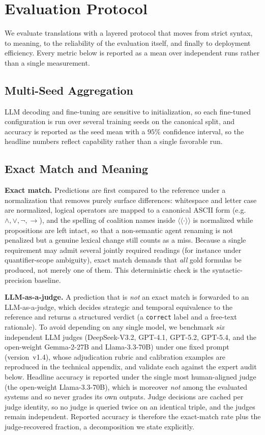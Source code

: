 \section{Evaluation Protocol}
\label{sec:evaluation}
We evaluate translations with a layered protocol that moves from strict syntax, to meaning, to the reliability of the evaluation itself, and finally to deployment efficiency. Every metric below is reported as a mean over independent runs rather than a single measurement.

\subsection{Multi-Seed Aggregation}
LLM decoding and fine-tuning are sensitive to initialization, so each fine-tuned configuration is run over several training seeds on the canonical split, and accuracy is reported as the seed mean with a $95\%$ confidence interval, so the headline numbers reflect capability rather than a single favorable run.

\subsection{Exact Match and Meaning}
\noindent\textbf{Exact match.} Predictions are first compared to the reference under a normalization that removes purely surface differences: whitespace and letter case are normalized, logical operators are mapped to a canonical ASCII form (e.g.\ $\land,\lor,\neg,\to$), and the spelling of coalition names inside $\langle\!\langle\cdot\rangle\!\rangle$ is normalized while propositions are left intact, so that a non-semantic agent renaming is not penalized but a genuine lexical change still counts as a miss. Because a single requirement may admit several jointly required readings (for instance under quantifier-scope ambiguity), exact match demands that \emph{all} gold formulas be produced, not merely one of them. This deterministic check is the syntactic-precision baseline.

\noindent\textbf{LLM-as-a-judge.} A prediction that is \emph{not} an exact match is forwarded to an LLM-as-a-judge, which decides strategic and temporal equivalence to the reference and returns a structured verdict (a \texttt{correct} label and a free-text rationale). To avoid depending on any single model, we benchmark \emph{six} independent LLM judges (DeepSeek-V3.2, GPT-4.1, GPT-5.2, GPT-5.4, and the open-weight Gemma-2-27B and Llama-3.3-70B) under one fixed prompt (version~v1.4), whose adjudication rubric and calibration examples are reproduced in the technical appendix, and validate each against the expert audit below. Headline accuracy is reported under the single most human-aligned judge (the open-weight Llama-3.3-70B), which is moreover \emph{not} among the evaluated systems and so never grades its own outputs. Judge decisions are cached per judge identity, so no judge is queried twice on an identical triple, and the judges remain independent. Reported accuracy is therefore the exact-match rate plus the judge-recovered fraction, a decomposition we state explicitly.

